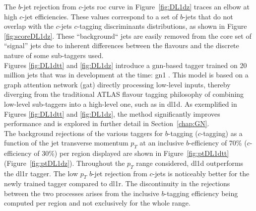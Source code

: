 The $b$-jet rejection from $c$-jets \gls{roc} curve in Figure~\ref{fig:DL1dz} traces an elbow at high $c$-jet efficiencies. These values correspond to a set of $b$-jets that do not overlap with the $c$-jets $c$-tagging discriminants distributions, as shown in Figure \ref{fig:scoreDL1dz}. These ``background`` jets are easily removed from the core set of ``signal'' jets due to inherent differences between the flavours and the discrete nature of some sub-taggers used. \\

Figures \ref{fig:DL1dtt} and \ref{fig:DL1dz} introduce a \gls{gnn}-based tagger trained on 20 million jets that was in development at the time: \gls{gn1} \cite{ATL-PHYS-PUB-2022-027}. This model is based on a graph attention network (\gls{gat}) directly processing low-level inputs, thereby diverging from the traditional ATLAS flavour tagging philosophy of combining low-level sub-taggers into a high-level one, such as in \gls{dl1d}. As exemplified in Figures \ref{fig:DL1dtt} and \ref{fig:DL1dz}, the method significantly improves performance and is explored in further detail in Section~\ref{chap:GN}. \\

The background rejections of the various taggers for $b$-tagging ($c$-tagging) as a function of the jet transverse momentum $p_T$ at an inclusive $b$-efficiency of 70\% ($c$-efficiency of 30\%) per region displayed are shown in Figure~\ref{fig:ptDL1dtt} (Figure~\ref{fig:ptDL1dz}). Throughout the $p_T$ range considered, \gls{dl1d} outperforms the \gls{dl1r} tagger. The low $p_T$ $b$-jet rejection from $c$-jets is noticeably better for the newly trained tagger compared to \gls{dl1r}. The discontinuity in the rejections between the two processes arises from the inclusive $b$-tagging efficiency being computed per region and not exclusively for the whole range.

